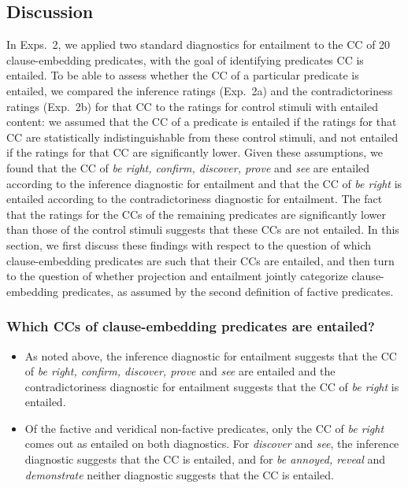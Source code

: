 \documentclass[11pt,fleqn]{article}
\newcommand{\6}{\mbox{$[\hspace*{-.6mm}[$}}
\newcommand{\9}{\mbox{$]\hspace*{-.6mm}]$}}
\begin{document}
{\newpage

\subsection{Discussion}\label{s33}

In Exps.~2, we applied two standard diagnostics for entailment to the CC of 20 clause-embedding predicates, with the goal of identifying predicates CC is entailed. To be able to assess whether the CC of a particular predicate is entailed, we compared the inference ratings (Exp.~2a) and the contradictoriness ratings (Exp.~2b) for that CC to the ratings for control stimuli with entailed content: we assumed that the CC of a predicate is entailed if the ratings for that CC are statistically indistinguishable from these control stimuli, and not entailed if the ratings for that CC are significantly lower. Given these assumptions, we found that the CC of {\em be right, confirm, discover, prove} and {\em see} are entailed according to the inference diagnostic for entailment and that the CC of {\em be right} is entailed according to the contradictoriness diagnostic for entailment. The fact that the ratings for the CCs of the remaining predicates are significantly lower than those of the control stimuli suggests that these CCs are not entailed. In this section, we first discuss these findings with respect to the question of which clause-embedding predicates are such that their CCs are entailed, and then turn to the question of whether projection and entailment jointly categorize clause-embedding predicates, as assumed by the second definition of factive predicates.

\subsubsection{Which CCs of clause-embedding predicates are entailed?}

\begin{itemize}

\item As noted above, the inference diagnostic for entailment suggests that the CC of {\em be right, confirm, discover, prove} and {\em see} are entailed and the contradictoriness diagnostic for entailment suggests that the CC of {\em be right} is entailed.

\item Of the factive and veridical non-factive predicates, only the CC of {\em be right} comes out as entailed on both diagnostics. For {\em discover} and {\em see}, the inference diagnostic suggests that the CC is entailed, and for {\em be annoyed, reveal} and {\em demonstrate} neither diagnostic suggests that the CC is entailed.


\end{itemize}}
\end{document}
